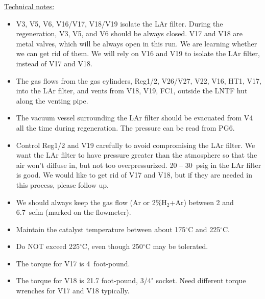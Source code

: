 \documentclass[letterpaper,11pt]{article}
\newcommand{\Hydro}     {H$_2$}
\newcommand{\dC}        {$^\circ$C}
\begin{document}
\underline{Technical notes:}
\begin{itemize}
\setlength\itemsep{-0.2em}
\item V3, V5, V6, V16/V17, V18/V19 isolate the LAr filter.  
During the regeneration, V3, V5, and V6 should be always closed.  
V17 and V18 are metal valves, which will be always open in this run.  We are learning whether we can get rid of them.
We will rely on V16 and V19 to isolate the LAr filter, instead of V17 and V18.
\item The gas flows from the gas cylinders, Reg1/2, V26/V27, V22, V16, HT1, V17, into the LAr filter, 
and vents from V18, V19, FC1, outside the LNTF hut along the venting pipe.
\item The vacuum vessel surrounding the LAr filter should be evacuated from V4 all the time during regeneration.  
The pressure can be read from PG6.
\item Control Reg1/2 and V19 carefully to avoid compromising the LAr filter.  We want the LAr filter to have pressure 
greater than the atmosphere so that the air won't diffuse in, but not too overpressurized.  
20 -- 30~psig in the LAr filter is good.
{\color{orange} We would like to get rid of V17 and V18, but if they are needed in this process, please follow up.}
\item We should always keep the gas flow (Ar or 2\%{\Hydro}+Ar) between 2 and 6.7~scfm (marked on the flowmeter).
\item Maintain the catalyst temperature between about 175{\dC} and 225{\dC}.
\item Do NOT exceed 225{\dC}, even though 250{\dC} may be tolerated.
\item The torque for V17 is 4~foot-pound.
\item The torque for V18 is 21.7 foot-pound, 3/4" socket.  Need different torque wrenches for V17 and V18 typically.
\end{itemize}
\end{document}
